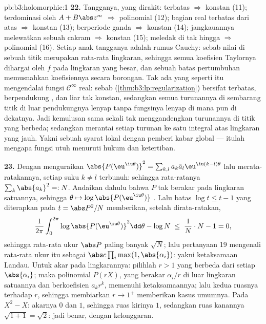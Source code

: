 \begin{solution}{pb:b3:holomorphic:1}
\textbf{22.} Tangganya, yang dirakit: terbatas $\Rightarrow$
konstan (11); terdominasi oleh $A + B\abs z^m$ $\Rightarrow$
polinomial (12); bagian real terbatas dari atas $\Rightarrow$
konstan (13); berperiode ganda $\Rightarrow$ konstan (14);
jangkauannya melewatkan sebuah cakram $\Rightarrow$ konstan (15); meledak di tak hingga
$\Rightarrow$ polinomial (16). Setiap anak tangganya adalah rumus
Cauchy: sebab nilai di sebuah titik merupakan rata-rata lingkaran, sehingga semua
koefisien Taylornya dihargai oleh  $f$ pada lingkaran
yang besar, dan sebuah batas pertumbuhan memusnahkan koefisiennya
secara borongan. Tak ada yang seperti itu mengendalai fungsi $\mathcal
C^\infty$ real: sebab 
(\cref{thm:b3:lp:regularization}) bersifat terbatas, berpendukung
, dan liar tak konstan, sedangkan semua turunannya di sembarang
titik di luar pendukungnya lenyap tanpa fungsinya
lenyap di mana pun di dekatnya. Jadi kemulusan sama sekali tak menggandengkan turunannya
di titik yang berbeda; sedangkan  merantai setiap
turunan ke satu integral atas lingkaran yang jauh. Yakni sebuah
syarat lokal dengan pemberi kabar global --- itulah mengapa
fungsi utuh menuruti hukum dan ketertiban.

\textbf{23.} Dengan menguraikan
$\abs{P(\eu^{\iu\theta})}^2 = \sum_{k,l}a_k\bar a_l
\eu^{\iu(k-l)\theta}$ lalu merata-ratakannya, setiap suku $k \neq
l$ terbunuh: sehingga rata-ratanya $\sum_k\abs{a_k}^2 =: N$. Andaikan dahulu bahwa
$P$ tak berakar pada lingkaran satuannya, sehingga $\theta \mapsto
\log\abs{P(\eu^{\iu\theta})}$ . Lalu batas $\log
t \leq t - 1$ yang diterapkan pada $t = \abs P^2/N$ memberikan, setelah
dirata-ratakan,
\[
\frac1{2\pi}\int_0^{2\pi}\log\abs{P(\eu^{\iu\theta})}^2
\dd\theta - \log N
\;\leq\; \frac1N\cdot N - 1 = 0,
\]
sehingga rata-rata ukur $\abs P$ paling banyak $\sqrt N$;
lalu pertanyaan 19 mengenali rata-rata ukur itu sebagai
$\abs c\prod_i\max(1, \abs{\alpha_i})$: yakni ketaksamaan
Landau. Untuk akar pada lingkarannya: pilihlah $r > 1$ yang berbeda dari
setiap $\abs{\alpha_i}$; maka polinomial $P(rX)$, yang berakar
$\alpha_i/r$ di luar lingkaran satuannya dan berkoefisien $a_kr^k$,
memenuhi ketaksamaannya; lalu kedua ruasnya  terhadap $r$,
sehingga membiarkan $r \to 1^+$ memberikan kasus umumnya. Pada $X^2 -
X$: akarnya $0$ dan $1$, sehingga ruas kirinya $1$, sedangkan
ruas kanannya $\sqrt{1 + 1} = \sqrt2$: jadi benar, dengan kelonggaran.


\end{solution}
